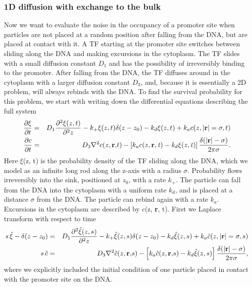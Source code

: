 \subsubsection{1D diffusion with exchange to the bulk}
Now we want to evaluate the noise in the occupancy of a promoter site when particles are not placed at a random position after falling from the DNA, but are placed at contact with it. A TF starting at the promoter site switches between sliding along the DNA and making excursions in the cytoplasm. The TF slides with a small diffusion constant $D_1$ and has the possibility of irreversibly binding to the promoter. After falling from the DNA, the TF diffuses around in the cytoplasm with a larger diffusion constant $D_3$, and, because it is essentially a 2D problem, will always rebinds with the DNA. To find the survival probability for this problem, we start with writing down the differential equations describing the full system
\setlength{\jot}{12pt}
\begin{eqnarray*}
 \frac{\partial \xi}{\partial t} & = & D_1 \frac{\partial^2\xi(z,t)}{\partial^2 z} - k_+ \xi(z,t) \delta(z - z_0) - k_d \xi(z,t) + k_a c(z, |{\bf r}| = \sigma, t) \\
 \frac{\partial c}{\partial t} & = & D_3 \nabla^2 c(z, \mathbf r \mathrm, t) - \left[ k_a c(z, \bf r \it, t) - k_d \xi(z,t) \right] \frac{\delta(|\mathbf r \mathrm| - \sigma)}{2 \pi \sigma}.
\end{eqnarray*}
Here $\xi$(z, t) is the probability density of the TF sliding along the DNA, which we model as an infinite long rod along the z-axis with a radius $\sigma$. Probability flows irreversibly into the sink, positioned at $z_0$, with a rate $k_+$. The particle can fall from the DNA into the cytoplasm with a uniform rate $k_d$, and is placed at a distance $\sigma$ from the DNA. The particle can rebind again with a rate $k_a$. Excursions in the cytoplasm are described by $c$(z, {\bf r}, t). First we Laplace transform with respect to time
\begin{eqnarray*}
 s \, \hat{\xi} - \delta(z - z_0) & = & D_1 \frac{\partial^2\hat{\xi}(z,s)}{\partial^2 z} - k_+ \hat{\xi}(z,s) \delta(z - z_0) - k_d \hat{\xi}(z,s) + k_a \hat{c}(z, |{\bf r}| = \sigma, s) \\
 s \, \hat{c} & = & D_3 \nabla^2 \hat{c}(z, \mathbf r \mathrm, s) - \left[ k_a \hat{c}(z, \mathbf r \mathrm, s) - k_d \hat{\xi}(z,s) \right] \frac{\delta(|\mathbf r \mathrm| - \sigma)}{2 \pi \sigma},
\end{eqnarray*}
where we explicitly included the initial condition of one particle placed in contact with the promoter site on the DNA.
